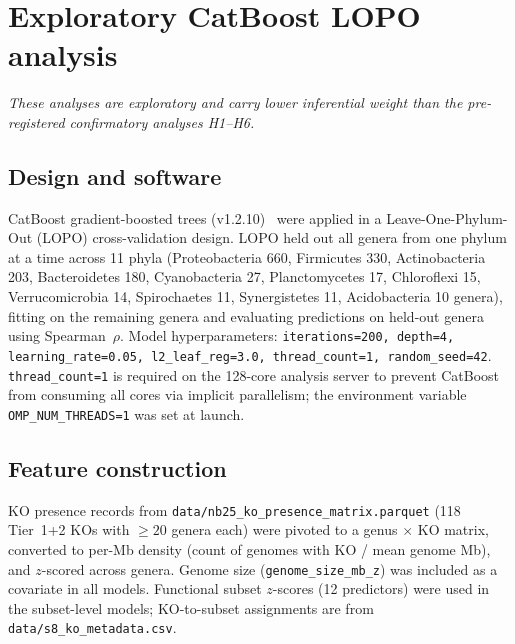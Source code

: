 \documentclass[11pt]{article}
\begin{document}
\clearpage

\section{Exploratory CatBoost LOPO analysis}
\label{sm:catboost}

\textit{These analyses are exploratory and carry lower inferential weight than the
pre-registered confirmatory analyses H1--H6.}

\subsection{Design and software}

CatBoost gradient-boosted trees (v1.2.10)~\cite{prokhorenkova2018catboost} were applied in a
Leave-One-Phylum-Out (LOPO) cross-validation design.
LOPO held out all genera from one phylum at a time across 11 phyla
(Proteobacteria 660, Firmicutes 330, Actinobacteria 203, Bacteroidetes 180,
Cyanobacteria 27, Planctomycetes 17, Chloroflexi 15, Verrucomicrobia 14,
Spirochaetes 11, Synergistetes 11, Acidobacteria 10 genera),
fitting on the remaining genera and evaluating predictions on held-out genera
using Spearman~$\rho$.
Model hyperparameters: \texttt{iterations=200, depth=4, learning\_rate=0.05,
l2\_leaf\_reg=3.0, thread\_count=1, random\_seed=42}.
\texttt{thread\_count=1} is required on the 128-core analysis server to
prevent CatBoost from consuming all cores via implicit parallelism; the
environment variable \texttt{OMP\_NUM\_THREADS=1} was set at launch.

\subsection{Feature construction}

KO presence records from \texttt{data/nb25\_ko\_presence\_matrix.parquet}
(118 Tier~1+2 KOs with $\geq\!20$ genera each) were pivoted to a
genus $\times$ KO matrix, converted to per-Mb density (count of genomes with
KO / mean genome Mb), and $z$-scored across genera.
Genome size (\texttt{genome\_size\_mb\_z}) was included as a covariate in all
models.
Functional subset $z$-scores (12 predictors) were used in the subset-level
models; KO-to-subset assignments are from \texttt{data/s8\_ko\_metadata.csv}.
\end{document}
